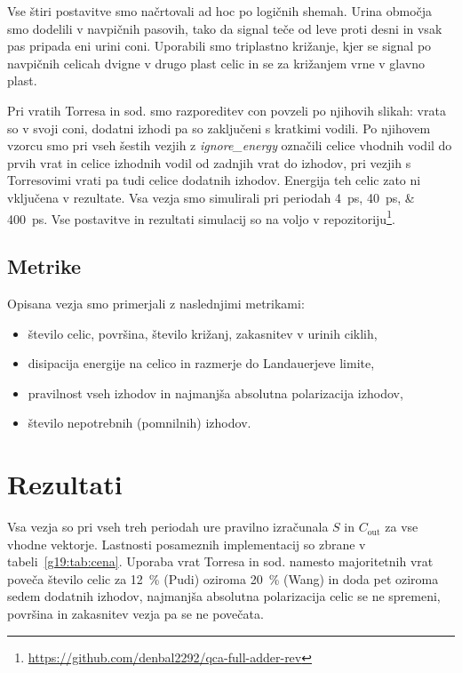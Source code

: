 Vse štiri postavitve smo načrtovali ad hoc po logičnih shemah. Urina območja smo dodelili v navpičnih pasovih, tako da signal teče od leve proti desni in vsak pas pripada eni urini coni. Uporabili smo triplastno križanje, kjer se signal po navpičnih celicah dvigne v drugo plast celic in se za križanjem vrne v glavno plast.

Pri vratih Torresa in sod. smo razporeditev con povzeli po njihovih slikah: vrata so v svoji coni, dodatni izhodi pa so zaključeni s kratkimi vodili. Po njihovem vzorcu smo pri vseh šestih vezjih z \textit{ignore\_energy} označili celice vhodnih vodil do prvih vrat in celice izhodnih vodil od zadnjih vrat do izhodov, pri vezjih s Torresovimi vrati pa tudi celice dodatnih izhodov. Energija teh celic zato ni vključena v rezultate. Vsa vezja smo simulirali pri periodah \SIlist{4;40;400}{\pico\second}. Vse postavitve in rezultati simulacij so na voljo v repozitoriju\footnote{\url{https://github.com/denbal2292/qca-full-adder-rev}}.

\subsection{Metrike}
\label{g19:sec:metrike}

Opisana vezja smo primerjali z naslednjimi metrikami:

\begin{itemize}
    \item število celic, površina, število križanj, zakasnitev v urinih ciklih,
    \item disipacija energije na celico in razmerje do Landauerjeve limite,
    \item pravilnost vseh izhodov in najmanjša absolutna polarizacija izhodov,
    \item število nepotrebnih (pomnilnih) izhodov.
\end{itemize}
 
\section{Rezultati}
\label{g19:sec:rezultati}

Vsa vezja so pri vseh treh periodah ure pravilno izračunala $S$ in $C_\mathrm{out}$ za vse vhodne vektorje. Lastnosti posameznih implementacij so zbrane v tabeli~\ref{g19:tab:cena}. Uporaba vrat Torresa in sod. namesto majoritetnih vrat poveča število celic za \SI{12}{\percent} (Pudi) oziroma \SI{20}{\percent} (Wang) in doda pet oziroma sedem dodatnih izhodov, najmanjša absolutna polarizacija celic se ne spremeni, površina in zakasnitev vezja pa se ne povečata.

